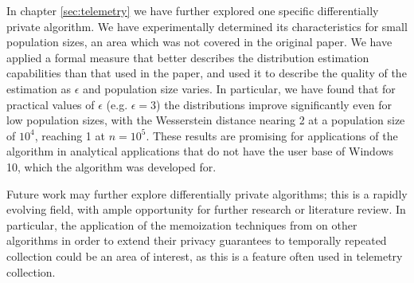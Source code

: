\documentclass[12pt]{article}
\begin{document}
In chapter \ref{sec:telemetry} we have further explored one specific differentially private algorithm. We have experimentally determined its characteristics for small population sizes, an area which was not covered in the original paper. We have applied a formal measure that better describes the distribution estimation capabilities than that used in the paper, and used it to describe the quality of the estimation as $\epsilon$ and population size varies. In particular, we have found that for practical values of $\epsilon$ (e.g. $\epsilon = 3$) the distributions improve significantly even for low population sizes, with the Wesserstein distance nearing 2 at a population size of $10^4$, reaching 1 at $n=10^5$. These results are promising for applications of the algorithm in analytical applications that do not have the user base of Windows 10, which the algorithm was developed for.

\bigskip

Future work may further explore differentially private algorithms; this is a rapidly evolving field, with ample opportunity for further research or literature review. In particular, the application of the memoization techniques from \cite{microsoft_telemetry} on other algorithms in order to extend their privacy guarantees to temporally repeated collection could be an area of interest, as this is a feature often used in telemetry collection.
\end{document}
